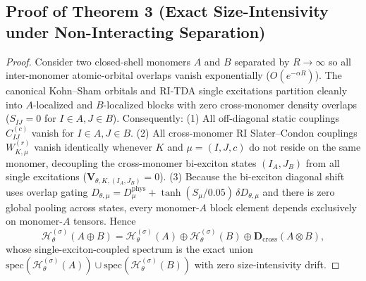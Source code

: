 \documentclass[10pt,a4paper]{article}
\newcommand{\Hlift}{\mathcal{H}_\theta^{(\sigma)}}
\begin{document}
\subsection*{Proof of Theorem 3 (Exact Size-Intensivity under Non-Interacting Separation)}
\begin{proof}
Consider two closed-shell monomers $A$ and $B$ separated by $R\to\infty$ so all inter-monomer atomic-orbital overlaps vanish exponentially ($O(e^{-\alpha R})$). The canonical Kohn--Sham orbitals and RI-TDA single excitations partition cleanly into $A$-localized and $B$-localized blocks with zero cross-monomer density overlaps ($S_{IJ}=0$ for $I\in A, J\in B$). Consequently:
(1) All off-diagonal static couplings $C_{IJ}^{(c)}$ vanish for $I\in A, J\in B$.
(2) All cross-monomer RI Slater--Condon couplings $W_{K,\mu}^{(r)}$ vanish identically whenever $K$ and $\mu=(I,J,c)$ do not reside on the same monomer, decoupling the cross-monomer bi-exciton states $(I_A, J_B)$ from all single excitations ($\mathbf{V}_{\theta,K,(I_A,J_B)}=0$).
(3) Because the bi-exciton diagonal shift uses overlap gating $D_{\theta,\mu} = D_\mu^{\mathrm{phys}} + \tanh(S_\mu/0.05)\,\delta D_{\theta,\mu}$ and there is zero global pooling across states, every monomer-$A$ block element depends exclusively on monomer-$A$ tensors. Hence
\begin{equation}
\Hlift(A \oplus B) = \Hlift(A) \oplus \Hlift(B) \oplus \mathbf{D}_{\mathrm{cross}}(A \otimes B),
\end{equation}
whose single-exciton-coupled spectrum is the exact union $\mathrm{spec}(\Hlift(A)) \cup \mathrm{spec}(\Hlift(B))$ with zero size-intensivity drift.
\end{proof}
\end{document}
